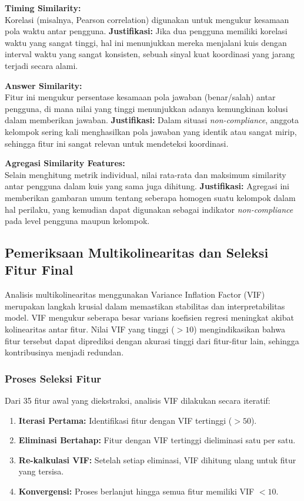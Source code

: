 \textbf{Timing Similarity:} \\
Korelasi (misalnya, Pearson correlation) digunakan untuk mengukur kesamaan pola waktu antar pengguna.
\textbf{Justifikasi:} Jika dua pengguna memiliki korelasi waktu yang sangat tinggi, hal ini menunjukkan mereka menjalani kuis dengan interval waktu yang sangat konsisten, sebuah sinyal kuat koordinasi yang jarang terjadi secara alami.

\textbf{Answer Similarity:} \\
Fitur ini mengukur persentase kesamaan pola jawaban (benar/salah) antar pengguna, di mana nilai yang tinggi menunjukkan adanya kemungkinan kolusi dalam memberikan jawaban.
\textbf{Justifikasi:} Dalam situasi \textit{non-compliance}, anggota kelompok sering kali menghasilkan pola jawaban yang identik atau sangat mirip, sehingga fitur ini sangat relevan untuk mendeteksi koordinasi.

\textbf{Agregasi Similarity Features:} \\
Selain menghitung metrik individual, nilai rata-rata dan maksimum similarity antar pengguna dalam kuis yang sama juga dihitung.
\textbf{Justifikasi:} Agregasi ini memberikan gambaran umum tentang seberapa homogen suatu kelompok dalam hal perilaku, yang kemudian dapat digunakan sebagai indikator \textit{non-compliance} pada level pengguna maupun kelompok.

\subsection{Pemeriksaan Multikolinearitas dan Seleksi Fitur Final}
\label{sec:pemeriksaanMultikolinearitas}

Analisis multikolinearitas menggunakan Variance Inflation Factor (VIF) merupakan langkah krusial dalam memastikan stabilitas dan interpretabilitas model. VIF mengukur seberapa besar varians koefisien regresi meningkat akibat kolinearitas antar fitur. Nilai VIF yang tinggi ($>10$) mengindikasikan bahwa fitur tersebut dapat diprediksi dengan akurasi tinggi dari fitur-fitur lain, sehingga kontribusinya menjadi redundan.

\subsubsection{Proses Seleksi Fitur}
Dari 35 fitur awal yang diekstraksi, analisis VIF dilakukan secara iteratif:
\begin{enumerate}
    \item \textbf{Iterasi Pertama:} Identifikasi fitur dengan VIF tertinggi ($>50$).
    \item \textbf{Eliminasi Bertahap:} Fitur dengan VIF tertinggi dieliminasi satu per satu.
    \item \textbf{Re-kalkulasi VIF:} Setelah setiap eliminasi, VIF dihitung ulang untuk fitur yang tersisa.
    \item \textbf{Konvergensi:} Proses berlanjut hingga semua fitur memiliki VIF $<10$.
\end{enumerate}

